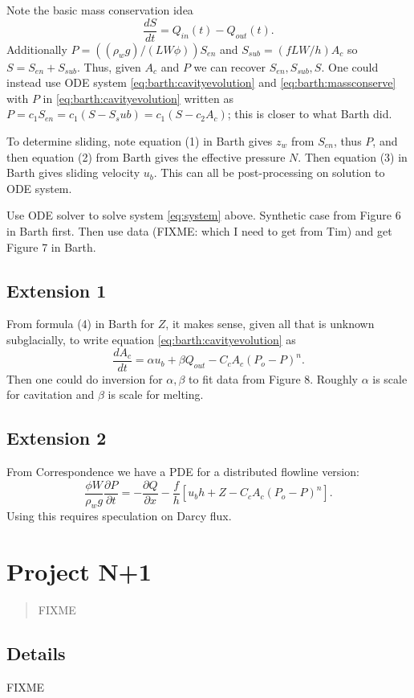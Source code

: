 \documentclass[11pt,final]{amsart}%
\begin{document}
Note the basic mass conservation idea
\begin{equation}
\frac{dS}{dt} = Q_{in}(t) - Q_{out}(t). \label{eq:barth:massconserve}
\end{equation}
Additionally $P = ((\rho_w g)/(LW\phi)) S_{en}$ and $S_{sub} = (fLW/h) A_c$ so $S = S_{en} + S_{sub}$.  Thus, given $A_c$ and $P$ we can recover $S_{en},S_{sub},S$.  One could instead use ODE system \eqref{eq:barth:cavityevolution} and \eqref{eq:barth:massconserve} with $P$ in \eqref{eq:barth:cavityevolution} written as $P= c_1 S_{en} = c_1 (S - S_sub) = c_1 (S - c_2 A_c)$; this is closer to what Barth did.

To determine sliding, note equation (1) in Barth gives $z_w$ from $S_{en}$, thus $P$, and then equation (2) from Barth gives the effective pressure $N$.  Then equation (3) in Barth gives sliding velocity $u_b$.  This can all be post-processing on solution to ODE system.

Use ODE solver to solve system \eqref{eq:system} above.  Synthetic case from Figure 6 in Barth first.  Then use data (FIXME: which I need to get from Tim) and get Figure 7 in Barth.

\subsection*{Extension 1}  From formula (4) in Barth for $Z$, it makes sense, given all that is unknown subglacially, to write equation \eqref{eq:barth:cavityevolution} as
\begin{equation*}
\frac{dA_c}{dt} = \alpha u_b + \beta Q_{out} - C_c A_c (P_o-P)^n.
\end{equation*}
Then one could do inversion for $\alpha,\beta$ to fit data from Figure 8.  Roughly $\alpha$ is scale for cavitation and $\beta$ is scale for melting.

\subsection*{Extension 2}  From Correspondence \citep{Bueler2014correspondence} we have a PDE for a distributed flowline version:
\begin{equation}
\frac{\phi W}{\rho_w g} \frac{\partial P}{\partial t} = - \frac{\partial Q}{\partial x} - \frac{f}{h} \left[u_b h + Z - C_c A_c (P_o-P)^n\right]. \label{eq:barth:distpressure}
\end{equation}
Using this requires speculation on Darcy flux.


\bigskip\bigskip
\section*{Project N+1}
\begin{quote}
FIXME
\end{quote}

\subsection*{Details} FIXME

\small

\normalsize
\end{document}
